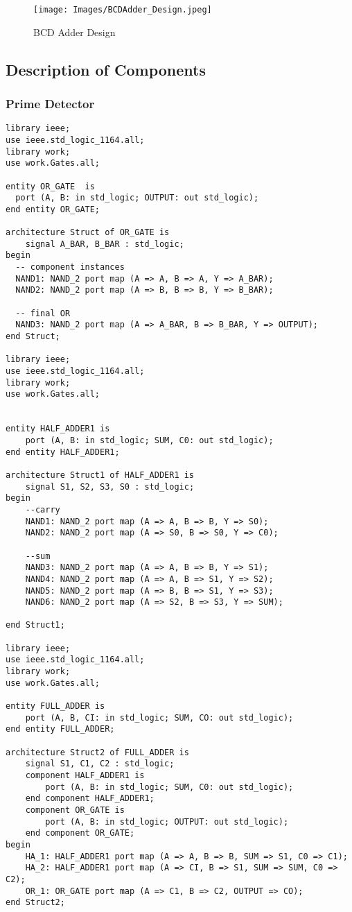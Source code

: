\documentclass[12pt]{article}
\begin{document}
\begin{figure}[H]
\centering
  \texttt{[image: Images/BCDAdder\_Design.jpeg]}
  \caption{BCD Adder Design}
\end{figure}

\subsection{Description of Components}
\subsubsection{Prime Detector}
\begin{verbatim}
library ieee;
use ieee.std_logic_1164.all;
library work;
use work.Gates.all;

entity OR_GATE  is
  port (A, B: in std_logic; OUTPUT: out std_logic);
end entity OR_GATE;

architecture Struct of OR_GATE is
	signal A_BAR, B_BAR : std_logic;
begin
  -- component instances
  NAND1: NAND_2 port map (A => A, B => A, Y => A_BAR);
  NAND2: NAND_2 port map (A => B, B => B, Y => B_BAR);
  
  -- final OR
  NAND3: NAND_2 port map (A => A_BAR, B => B_BAR, Y => OUTPUT);
end Struct;

library ieee;
use ieee.std_logic_1164.all;
library work;
use work.Gates.all;


entity HALF_ADDER1 is
	port (A, B: in std_logic; SUM, C0: out std_logic);
end entity HALF_ADDER1;

architecture Struct1 of HALF_ADDER1 is
	signal S1, S2, S3, S0 : std_logic;
begin
	--carry
	NAND1: NAND_2 port map (A => A, B => B, Y => S0);
	NAND2: NAND_2 port map (A => S0, B => S0, Y => C0);
	
	--sum
	NAND3: NAND_2 port map (A => A, B => B, Y => S1);
	NAND4: NAND_2 port map (A => A, B => S1, Y => S2);
	NAND5: NAND_2 port map (A => B, B => S1, Y => S3);
	NAND6: NAND_2 port map (A => S2, B => S3, Y => SUM);

end Struct1;

library ieee;
use ieee.std_logic_1164.all;
library work;
use work.Gates.all;

entity FULL_ADDER is
	port (A, B, CI: in std_logic; SUM, CO: out std_logic);
end entity FULL_ADDER;

architecture Struct2 of FULL_ADDER is
	signal S1, C1, C2 : std_logic;
	component HALF_ADDER1 is
		port (A, B: in std_logic; SUM, C0: out std_logic);
	end component HALF_ADDER1;
	component OR_GATE is
		port (A, B: in std_logic; OUTPUT: out std_logic);
	end component OR_GATE;
begin
	HA_1: HALF_ADDER1 port map (A => A, B => B, SUM => S1, C0 => C1);
	HA_2: HALF_ADDER1 port map (A => CI, B => S1, SUM => SUM, C0 => C2);
	OR_1: OR_GATE port map (A => C1, B => C2, OUTPUT => CO);
end Struct2;


\end{verbatim}
\end{document}
